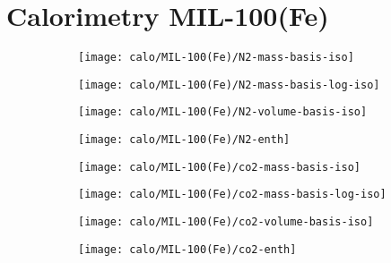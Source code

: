 
\section{Calorimetry MIL-100(Fe)}

\begin{figure}[H]
    \centering

    \begin{subfigure}{0.25\linewidth}
        \texttt{[image: calo/MIL-100(Fe)/N2-mass-basis-iso]}%
        \label{appx:fgr:shaping:mil100n2mass}
    \end{subfigure}%
    \begin{subfigure}{0.25\linewidth}
        \texttt{[image: calo/MIL-100(Fe)/N2-mass-basis-log-iso]}%
        \label{appx:fgr:shaping:mil100n2masslog}
    \end{subfigure}%
    \begin{subfigure}{0.25\linewidth}
        \texttt{[image: calo/MIL-100(Fe)/N2-volume-basis-iso]}%
        \label{appx:fgr:shaping:mil100n2volume}
    \end{subfigure}%
    \begin{subfigure}{0.25\linewidth}
        \texttt{[image: calo/MIL-100(Fe)/N2-enth]}%
        \label{appx:fgr:shaping:mil100n2enth}
    \end{subfigure}%
    
    \begin{subfigure}{0.25\textwidth}
        \texttt{[image: calo/MIL-100(Fe)/co2-mass-basis-iso]}%
        \label{appx:fgr:shaping:mil100co2mass}
    \end{subfigure}%
    \begin{subfigure}{0.25\textwidth}
        \texttt{[image: calo/MIL-100(Fe)/co2-mass-basis-log-iso]}%
        \label{appx:fgr:shaping:mil100co2masslog}
    \end{subfigure}%
    \begin{subfigure}{0.25\textwidth}
        \texttt{[image: calo/MIL-100(Fe)/co2-volume-basis-iso]}%
        \label{appx:fgr:shaping:mil100co2volume}
    \end{subfigure}%
    \begin{subfigure}{0.25\textwidth}
        \texttt{[image: calo/MIL-100(Fe)/co2-enth]}%
        \label{appx:fgr:shaping:mil100co2enth}
    \end{subfigure}%


\end{figure}
